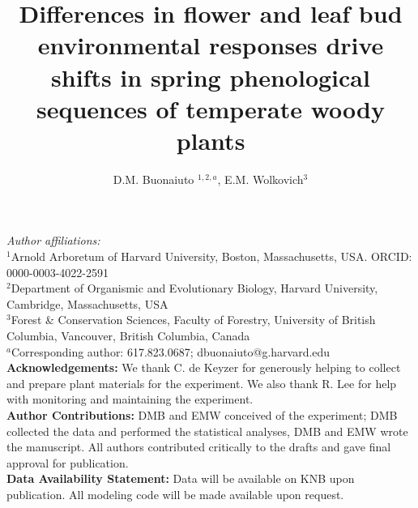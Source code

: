 \documentclass[11pt]{article}\usepackage[]{graphicx}\usepackage[]{color}
\title{Differences in flower and leaf bud environmental responses drive shifts in spring phenological sequences of temperate woody plants}
\date{}
\author{D.M. Buonaiuto $^{1,2,a}$, E.M. Wolkovich$^{3}$}
\begin{document}
\maketitle
\noindent \emph{Author affiliations:}\\
\noindent $^1$Arnold Arboretum of Harvard University, Boston, Massachusetts, USA. ORCID: 0000-0003-4022-2591\\
$^2$Department of Organismic and Evolutionary Biology, Harvard University, Cambridge, Massachusetts, USA \\
$^3$Forest \& Conservation Sciences, Faculty of Forestry, University of British Columbia, Vancouver, British Columbia, Canada\\
$^a$Corresponding author: 617.823.0687; dbuonaiuto@g.harvard.edu\\

\textbf{Acknowledgements:} We thank C. de Keyzer for generously helping to collect and prepare plant materials for the experiment. We also thank R. Lee for help with monitoring and maintaining the experiment.\\

\textbf{Author Contributions:} DMB and EMW conceived of the experiment; DMB collected the data and performed the statistical analyses, DMB and EMW wrote the manuscript. All authors contributed critically to the drafts and gave final approval for publication.\\

\textbf{Data Availability Statement:} Data will be available on KNB upon publication. All modeling code will be made available upon request.

\pagebreak


\maketitle
\end{document}
